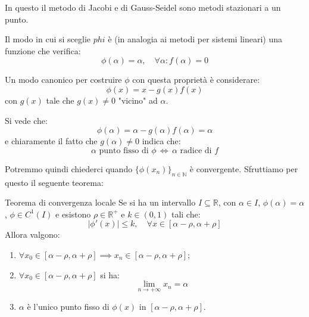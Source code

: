 \documentclass[a4paper,11pt]{article}
\begin{document}
In questo il metodo di Jacobi e di Gauss-Seidel sono metodi stazionari a un punto.

Il modo in cui si sceglie $phi$ è (in analogia ai metodi per sistemi lineari) una funzione che verifica:
$$
\phi(\alpha) = \alpha, \quad \forall \alpha : f(\alpha) = 0
$$

Un modo canonico per costruire $\phi$ con questa proprietà è considerare:
$$
\phi(x) = x - g(x) f(x)
$$
con $g(x)$ tale che $g(x) \neq 0$ "vicino" ad $\alpha$.

Si vede che:
$$
\phi(\alpha) = \alpha - g(\alpha) f(\alpha) = \alpha
$$
e chiaramente il fatto che $g(\alpha) \neq 0$ indica che:
$$
\alpha \text{ punto fisso di $\phi$} \, \Leftrightarrow \, \alpha \text{ radice di $f$}
$$

Potremmo quindi chiederci quando $\{ \phi(x_n) \}_{n \in \mathbb{N}}$ è convergente.
Sfruttiamo per questo il seguente teorema:
\begin{theorem}{Teorema di convergenza locale}
	Se si ha un intervallo $I \subseteq \mathbb{R}$, con $\alpha \in I$, $\phi(\alpha) = \alpha$, $\phi \in C^1(I)$ e esistono $\rho \in \mathbb{R}^+$ e $k \in (0, 1)$ tali che:
	$$
	|\phi'(x)| \leq k, \quad \forall x \in [\alpha - \rho, \alpha + \rho]
	$$
	Allora valgono:
	\begin{enumerate}
		\item $\forall x_0 \in [\alpha - \rho, \alpha + \rho] \implies x_n \in [\alpha - \rho, \alpha + \rho]$;
		\item $\forall x_0 \in [\alpha - \rho, \alpha + \rho]$ si ha:
			$$
				\lim_{n \rightarrow + \infty} x_n = \alpha
			$$
		\item $\alpha$ è l'unico punto fisso di $\phi(x)$ in $[\alpha - \rho, \alpha + \rho]$.
	\end{enumerate}
\end{theorem}
\end{document}
